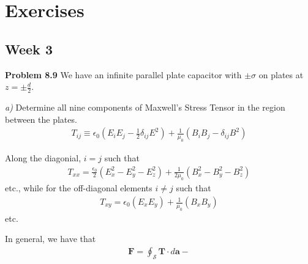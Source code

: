 \section{Exercises}
\subsection{Week 3}
\textbf{Problem 8.9}
We have an infinite parallel plate capacitor with \(\pm \sigma\) on plates at \(z = \pm \frac{d}{2}\).

\textit{a)} Determine all nine components of Maxwell's Stress Tensor in the region between the plates.
\begin{align*}
    T_{ij} \equiv \epsilon_0\left( E_i E_j - \frac{1}{2} \delta_{ij}E^{2}   \right) + \frac{1}{\mu _0} \left( B_i B_j - \delta_{ij} B^{2}   \right)   
\end{align*}

Along the diagonial, \(i = j\) such that \begin{align*}
    T_{xx} = \frac{\epsilon_0}{2}\left( E_x ^{2}  - E_y ^{2} - E_z ^{2}  \right) + \frac{1}{2\mu _0} \left(B_x ^{2}  - B_y ^{2} - B_z ^{2}    \right) 
\end{align*} 
etc., while for the off-diagonal elements \(i \neq j\) such that \begin{align*}
    T_{xy} = \epsilon_0\left( E_x E_y\right) + \frac{1}{\mu _0}\left( B_x B_y \right)
\end{align*} 
etc.

In general, we have that \begin{align*}
    \mathbf{F} = \oint_{\mathcal{S} } \mathbf{T} \cdot d \mathbf{a} - 
\end{align*}